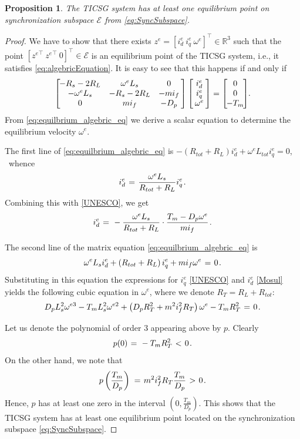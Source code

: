 \documentclass[letterpaper, 10 pt, conference]{ieeeconf}
\newtheorem{proposition}[theorem]{Proposition}
\newcommand{\BE}{\begin{equation}}
\newcommand{\BEQ}[1]{\BE\label{#1}} %
\newcommand{\rline}  {{\mathbb R}}
\renewcommand{\o}    {{\omega}}
\newcommand{\m}      {{\hbox{\hskip 1pt}}}
\newcommand{\nm}     {{\hbox{\hskip -3pt}}}
\newcommand{\Emscr}  {{\mathcal{E}}}
\begin{document}
\begin{proposition} \label{EqPointsProp2}
The TICSG system has at least one equilibrium point on
synchronization subspace $\Emscr$ from \eqref{eq:SyncSubspace}.
\end{proposition}

\begin{proof}
We have to show that there exists $z^e=[i_d^e\ i_q^e\ \o^e]^\top\in
\rline^3$ such that the point $[{z^e}^\top\ {z^e}^\top\ 0]^\top\in
\Emscr$ is an equilibrium point of the TICSG system, i.e., it
satisfies \eqref{eq:algebricEquation}. It is easy to see that this 
happens if and only if
\begin{equation} \label{eq:equilbrium_algebric_eq}
   \left[\nm\nm\begin{array}{ccc} -R_s-2R_L & \o^e L_s & 0\\
   -\o^e L_s & -R_s-2R_L & -m i_f\\ 0 & m i_f & -D_p
   \end{array} \nm\right] \left[\nm\begin{array}{c} i_d^e\\
   i_q^e\\ \o^e \end{array} \nm\right] = \left[\nm\nm 
   \begin{array}{c} 0\\ 0\\ -T_m\end{array} \nm\nm\right]\nm\m.
\end{equation}
From \eqref{eq:equilbrium_algebric_eq} we derive a scalar equation to
determine the equilibrium velocity $\o^e$.

The first line of \eqref{eq:equilbrium_algebric_eq}
is $-\left(R_{tot}+R_L\right)i_d^e+\o^e L_{tot}i_q^e=0$, \ whence
\vspace{-1mm}
$$i_d^e \m=\m \frac{\o^e L_s}{R_{tot}+R_L} i_q^e \m.$$
Combining this with \eqref{UNESCO}, we get
\BEQ{Mosul}
   i_{d}^{e} \m=\m -\frac{\o^e L_s}{R_{tot}+R_L} \cdot \frac{T_m-D_p
   \o^e}{mi_f} \m.
\end{equation}

The second line of the matrix equation 
\eqref{eq:equilbrium_algebric_eq} is
$$ \o^{e}L_s i_d^e + \left(R_{tot} + R_L\right) i_q^e + mi_f\o^e 
   \m=\m 0 \m.$$
Substituting in this equation the expressions for $i_q^e$ 
\eqref{UNESCO} and $i_d^e$ \eqref{Mosul} yields the following cubic
equation in $\o^e$, where we denote $R_T=R_L+R_{tot}$:
$$ D_p L_s^2\o^{e3}-T_m L_s^2 \o^{e2} +\left(D_p R_T^2+m^2 i_f^2 
   R_T\right) \o^e - T_m R_T^2 \m=\m 0 \m.$$

Let us denote the polynomial of order 3 appearing above by $p$. 
Clearly \vspace{-2mm}
$$p(0) \m=\m -T_m R_T^2 \m<\m 0 \m.$$
On the other hand, we note that 
$$ p\left(\frac{T_m}{D_p}\right) \m=\m m^2 i_f^2 R_T\frac{T_m}{D_p} 
   \m>\m 0 \m.$$
Hence, $p$ has at least one zero in the interval $\left(0,
\frac{T_m}{D_p}\right)$. This shows that the TICSG system has at least
one equilibrium point located on the synchronization subspace 
\eqref{eq:SyncSubspace}.
\end{proof}
\end{document}
